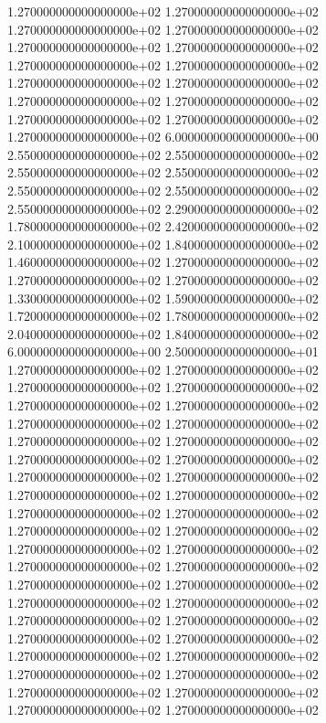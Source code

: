 1.270000000000000000e+02 1.270000000000000000e+02 1.270000000000000000e+02 1.270000000000000000e+02 1.270000000000000000e+02 1.270000000000000000e+02 1.270000000000000000e+02 1.270000000000000000e+02 1.270000000000000000e+02 1.270000000000000000e+02 1.270000000000000000e+02 1.270000000000000000e+02 1.270000000000000000e+02 1.270000000000000000e+02 1.270000000000000000e+02 6.000000000000000000e+00 2.550000000000000000e+02 2.550000000000000000e+02 2.550000000000000000e+02 2.550000000000000000e+02 2.550000000000000000e+02 2.550000000000000000e+02 2.550000000000000000e+02 2.290000000000000000e+02 1.780000000000000000e+02 2.420000000000000000e+02 2.100000000000000000e+02 1.840000000000000000e+02 1.460000000000000000e+02 1.270000000000000000e+02 1.270000000000000000e+02 1.270000000000000000e+02 1.330000000000000000e+02 1.590000000000000000e+02 1.720000000000000000e+02 1.780000000000000000e+02 2.040000000000000000e+02 1.840000000000000000e+02 6.000000000000000000e+00 2.500000000000000000e+01 1.270000000000000000e+02 1.270000000000000000e+02 1.270000000000000000e+02 1.270000000000000000e+02 1.270000000000000000e+02 1.270000000000000000e+02 1.270000000000000000e+02 1.270000000000000000e+02 1.270000000000000000e+02 1.270000000000000000e+02 1.270000000000000000e+02 1.270000000000000000e+02 1.270000000000000000e+02 1.270000000000000000e+02 1.270000000000000000e+02 1.270000000000000000e+02 1.270000000000000000e+02 1.270000000000000000e+02 1.270000000000000000e+02 1.270000000000000000e+02 1.270000000000000000e+02 1.270000000000000000e+02 1.270000000000000000e+02 1.270000000000000000e+02 1.270000000000000000e+02 1.270000000000000000e+02 1.270000000000000000e+02 1.270000000000000000e+02 1.270000000000000000e+02 1.270000000000000000e+02 1.270000000000000000e+02 1.270000000000000000e+02 1.270000000000000000e+02 1.270000000000000000e+02 1.270000000000000000e+02 1.270000000000000000e+02 1.270000000000000000e+02 1.270000000000000000e+02 1.270000000000000000e+02 1.270000000000000000e+02
